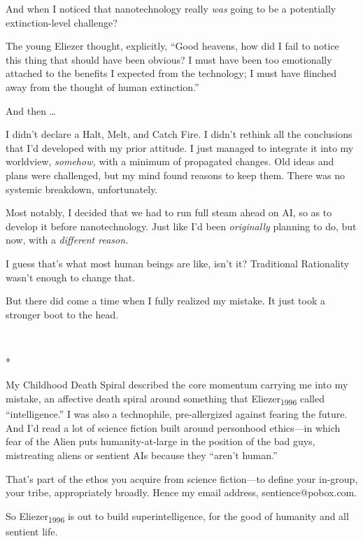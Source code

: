 {
 And when I noticed that nanotechnology really \textit{was} going
to be a potentially extinction-level challenge?}

{
 The young Eliezer thought, explicitly, ``Good
heavens, how did I fail to notice this thing that should have been
obvious? I must have been too emotionally attached to the benefits I
expected from the technology; I must have flinched away from the
thought of human extinction.''}

{
 And then \ldots}

{
 I didn't declare a Halt, Melt, and Catch Fire. I
didn't rethink all the conclusions that
I'd developed with my prior attitude. I just managed to
integrate it into my worldview, \textit{somehow,} with a minimum of
propagated changes. Old ideas and plans were challenged, but my mind
found reasons to keep them. There was no systemic breakdown,
unfortunately.}

{
 Most notably, I decided that we had to run full steam ahead on AI,
so as to develop it before nanotechnology. Just like
I'd been \textit{originally} planning to do, but now,
with a \textit{different reason.}}

{
 I guess that's what most human beings are like,
isn't it? Traditional Rationality
wasn't enough to change that.}

{
 But there did come a time when I fully realized my mistake. It
just took a stronger boot to the head.}

{\centering
 \ ~
\par}

{\centering
 *
\par}


{
 My Childhood Death Spiral described the core momentum carrying me
into my mistake, an affective death spiral around something that
Eliezer\textsubscript{1996} called
``intelligence.'' I was also a
technophile, pre-allergized against fearing the future. And
I'd read a lot of science fiction built around
personhood ethics---in which fear of the Alien puts humanity-at-large
in the position of the bad guys, mistreating aliens or sentient AIs
because they ``aren't
human.'' }

{
 That's part of the ethos you acquire from science
fiction---to define your in-group, your tribe, appropriately broadly.
Hence my email address, sentience@pobox.com.}

{
 So Eliezer\textsubscript{1996} is out to build superintelligence,
for the good of humanity and all sentient life.}

